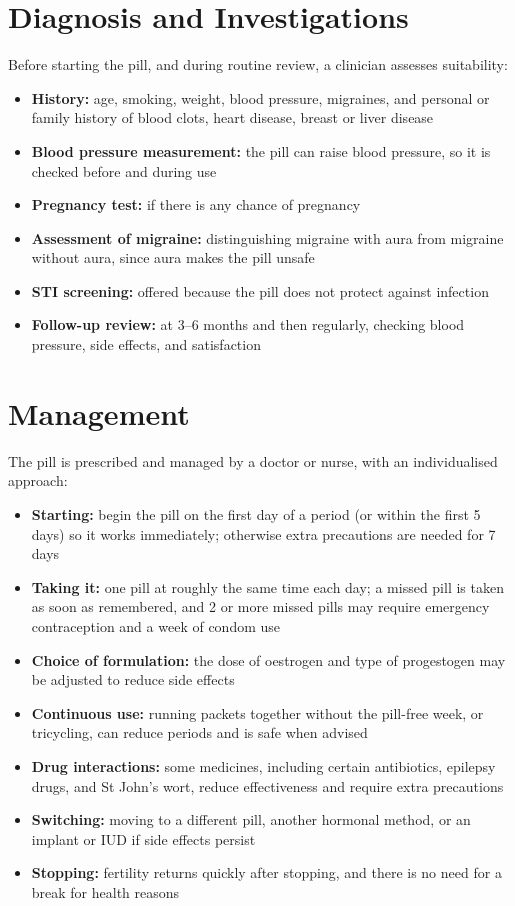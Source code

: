 \section*{Diagnosis and Investigations}
Before starting the pill, and during routine review, a clinician assesses suitability:

\begin{itemize}
    \item \textbf{History:} age, smoking, weight, blood pressure, migraines, and personal or family history of blood clots, heart disease, breast or liver disease
    \item \textbf{Blood pressure measurement:} the pill can raise blood pressure, so it is checked before and during use
    \item \textbf{Pregnancy test:} if there is any chance of pregnancy
    \item \textbf{Assessment of migraine:} distinguishing migraine with aura from migraine without aura, since aura makes the pill unsafe
    \item \textbf{STI screening:} offered because the pill does not protect against infection
    \item \textbf{Follow-up review:} at 3--6 months and then regularly, checking blood pressure, side effects, and satisfaction
\end{itemize}

\section*{Management}
The pill is prescribed and managed by a doctor or nurse, with an individualised approach:

\begin{itemize}
    \item \textbf{Starting:} begin the pill on the first day of a period (or within the first 5 days) so it works immediately; otherwise extra precautions are needed for 7 days
    \item \textbf{Taking it:} one pill at roughly the same time each day; a missed pill is taken as soon as remembered, and 2 or more missed pills may require emergency contraception and a week of condom use
    \item \textbf{Choice of formulation:} the dose of oestrogen and type of progestogen may be adjusted to reduce side effects
    \item \textbf{Continuous use:} running packets together without the pill-free week, or tricycling, can reduce periods and is safe when advised
    \item \textbf{Drug interactions:} some medicines, including certain antibiotics, epilepsy drugs, and St John's wort, reduce effectiveness and require extra precautions
    \item \textbf{Switching:} moving to a different pill, another hormonal method, or an implant or IUD if side effects persist
    \item \textbf{Stopping:} fertility returns quickly after stopping, and there is no need for a break for health reasons
\end{itemize}

